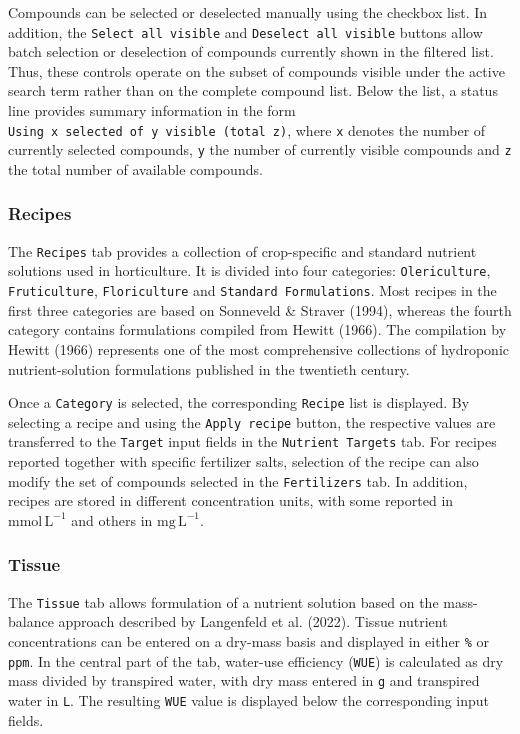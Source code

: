 \documentclass[
  letterpaper,
  DIV=11,
  numbers=noendperiod]{scrreprt}
\begin{document}
Compounds can be selected or deselected manually using the checkbox
list. In addition, the \texttt{Select\ all\ visible} and
\texttt{Deselect\ all\ visible} buttons allow batch selection or
deselection of compounds currently shown in the filtered list. Thus,
these controls operate on the subset of compounds visible under the
active search term rather than on the complete compound list. Below the
list, a status line provides summary information in the form
\texttt{Using\ x\ selected\ of\ y\ visible\ (total\ z)}, where
\texttt{x} denotes the number of currently selected compounds,
\texttt{y} the number of currently visible compounds and \texttt{z} the
total number of available compounds.

\subsubsection{Recipes}\label{recipes}

The \texttt{Recipes} tab provides a collection of crop-specific and
standard nutrient solutions used in horticulture. It is divided into
four categories: \texttt{Olericulture}, \texttt{Fruticulture},
\texttt{Floriculture} and \texttt{Standard\ Formulations}. Most recipes
in the first three categories are based on Sonneveld \& Straver (1994),
whereas the fourth category contains formulations compiled from Hewitt
(1966). The compilation by Hewitt (1966) represents one of the most
comprehensive collections of hydroponic nutrient-solution formulations
published in the twentieth century.

Once a \texttt{Category} is selected, the corresponding \texttt{Recipe}
list is displayed. By selecting a recipe and using the
\texttt{Apply\ recipe} button, the respective values are transferred to
the \texttt{Target} input fields in the \texttt{Nutrient\ Targets} tab.
For recipes reported together with specific fertilizer salts, selection
of the recipe can also modify the set of compounds selected in the
\texttt{Fertilizers} tab. In addition, recipes are stored in different
concentration units, with some reported in \(\mathrm{mmol\,L^{-1}}\) and
others in \(\mathrm{mg\,L^{-1}}\).

\subsubsection{Tissue}\label{tissue}

The \texttt{Tissue} tab allows formulation of a nutrient solution based
on the mass-balance approach described by Langenfeld et al. (2022).
Tissue nutrient concentrations can be entered on a dry-mass basis and
displayed in either \texttt{\%} or \texttt{ppm}. In the central part of
the tab, water-use efficiency (\texttt{WUE}) is calculated as dry mass
divided by transpired water, with dry mass entered in \texttt{g} and
transpired water in \texttt{L}. The resulting \texttt{WUE} value is
displayed below the corresponding input fields.
\end{document}
